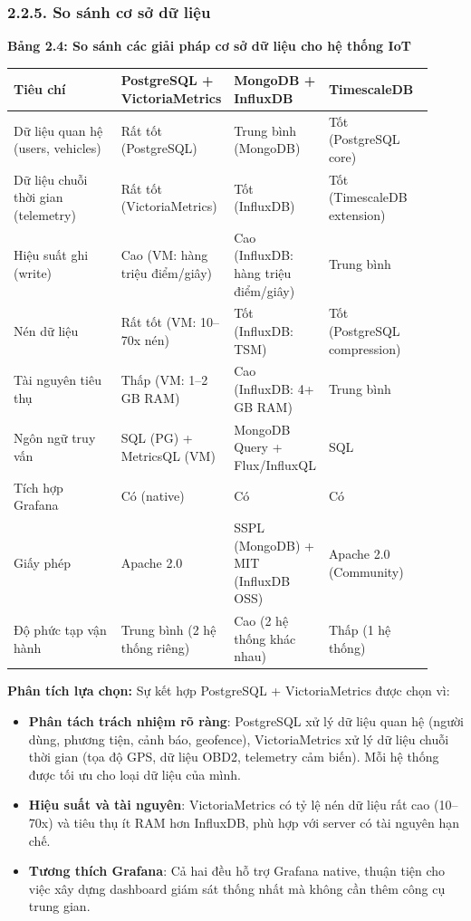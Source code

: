 \documentclass[13pt,a4paper]{extarticle}
\newcounter{none} %
\newcommand{\thesislongtableorignewline}{}
\let\thesislongtableorignewline\\
\renewcommand{\\}{\thesislongtableorignewline\hline}%
\let\\\thesislongtableorignewline
\newcommand{\thesistabletitle}[1]{%
  \begin{center}\textbf{#1}\end{center}%
}
\providecommand{\tightlist}{%
  \setlength{\itemsep}{0pt}\setlength{\parskip}{0pt}}
\begin{document}
\subsubsection{2.2.5. So sánh cơ sở dữ
liệu}\label{225-so-suxe1nh-cux1a1-sux1edf-dux1eef-liux1ec7u}

\thesistabletitle{Bảng 2.4: So sánh các giải pháp cơ sở dữ liệu cho hệ thống IoT}

{\def\LTcaptype{none} %
\begin{longtable}{|p{0.30\linewidth}|p{0.16\linewidth}|p{0.20\linewidth}|p{0.26\linewidth}|}
\hline \textbf{Tiêu chí} & \textbf{PostgreSQL + VictoriaMetrics} & \textbf{MongoDB + InfluxDB} & \textbf{TimescaleDB} \\
\hline
\endhead
\hline
\endlastfoot
Dữ liệu quan hệ (users, vehicles) & Rất tốt (PostgreSQL) & Trung bình
(MongoDB) & Tốt (PostgreSQL core) \\
Dữ liệu chuỗi thời gian (telemetry) & Rất tốt (VictoriaMetrics) & Tốt
(InfluxDB) & Tốt (TimescaleDB extension) \\
Hiệu suất ghi (write) & Cao (VM: hàng triệu điểm/giây) & Cao (InfluxDB:
hàng triệu điểm/giây) & Trung bình \\
Nén dữ liệu & Rất tốt (VM: 10--70x nén) & Tốt (InfluxDB: TSM) & Tốt
(PostgreSQL compression) \\
Tài nguyên tiêu thụ & Thấp (VM: 1--2 GB RAM) & Cao (InfluxDB: 4+ GB RAM)
& Trung bình \\
Ngôn ngữ truy vấn & SQL (PG) + MetricsQL (VM) & MongoDB Query +
Flux/InfluxQL & SQL \\
Tích hợp Grafana & Có (native) & Có & Có \\
Giấy phép & Apache 2.0 & SSPL (MongoDB) + MIT (InfluxDB OSS) & Apache
2.0 (Community) \\
Độ phức tạp vận hành & Trung bình (2 hệ thống riêng) & Cao (2 hệ thống
khác nhau) & Thấp (1 hệ thống) \\
\end{longtable}
}

\textbf{Phân tích lựa chọn:} Sự kết hợp PostgreSQL + VictoriaMetrics
được chọn vì:

\begin{itemize}
\tightlist
\item
  \textbf{Phân tách trách nhiệm rõ ràng}: PostgreSQL xử lý dữ liệu quan
  hệ (người dùng, phương tiện, cảnh báo, geofence), VictoriaMetrics xử
  lý dữ liệu chuỗi thời gian (tọa độ GPS, dữ liệu OBD2, telemetry cảm
  biến). Mỗi hệ thống được tối ưu cho loại dữ liệu của mình.
\item
  \textbf{Hiệu suất và tài nguyên}: VictoriaMetrics có tỷ lệ nén dữ liệu
  rất cao (10--70x) và tiêu thụ ít RAM hơn InfluxDB, phù hợp với server
  có tài nguyên hạn chế.
\item
  \textbf{Tương thích Grafana}: Cả hai đều hỗ trợ Grafana native, thuận
  tiện cho việc xây dựng dashboard giám sát thống nhất mà không cần thêm
  công cụ trung gian.
\end{itemize}
\end{document}
